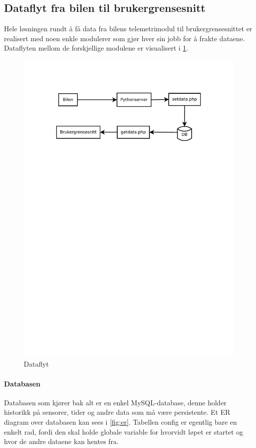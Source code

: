 \label{sec:losning}
\subsection{Dataflyt fra bilen til brukergrensesnitt}
Hele løsningen rundt å få data fra bilens telemetrimodul til brukergrensesnittet er realisert med noen enkle modulerer som gjør hver sin jobb for å frakte dataene. Dataflyten mellom de forskjellige modulene er visualisert i \ref{fig:dataflow}.

\begin{figure}[H]
\includegraphics[width=\textwidth, trim=0 540 0 75]{images/dataflow.pdf}
\caption{Dataflyt}
\label{fig:dataflow}
\end{figure}

\paragraph{Databasen}
Databasen som kjører bak alt er en enkel MySQL-database, denne holder historikk på sensorer, tider og andre data som må være persistente. Et ER diagram over databasen kan sees i \ref{fig:er}. Tabellen config er egentlig bare en enkelt rad, fordi den skal holde globale variable for hvorvidt løpet er startet og hvor de andre dataene kan hentes fra.

